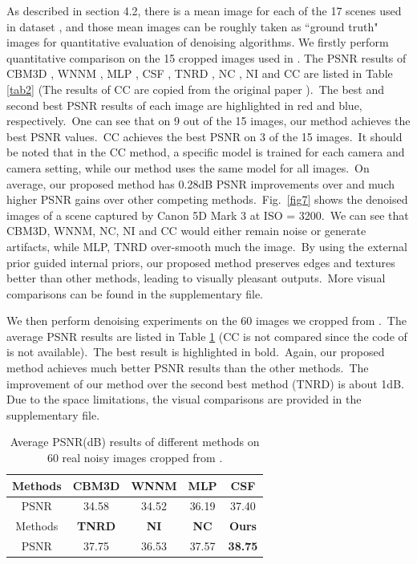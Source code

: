 \documentclass[10pt,twocolumn,letterpaper]{article}
\begin{document}
As described in section 4.2, there is a mean image for each of the 17 scenes used in dataset \cite{crosschannel2016}, and those mean images can be roughly taken as ``ground truth" images for quantitative evaluation of denoising algorithms. We firstly perform quantitative comparison on the 15 cropped images used in \cite{crosschannel2016}. The PSNR results of CBM3D \cite{bm3d}, WNNM \cite{wnnm}, MLP \cite{mlp}, CSF \cite{csf}, TNRD \cite{chen2015learning}, NC \cite{noiseclinic,ncwebsite}, NI \cite{neatimage} and
CC \cite{crosschannel2016} are listed in Table \ref{tab2} (The results of CC are copied from the original paper \cite{crosschannel2016}).\ The best and second best PSNR results of each image are highlighted in red and blue, respectively.\ One can see that on 9 out of the 15 images, our method achieves the best PSNR values.\ CC achieves the best PSNR on 3 of the 15 images.\ It should be noted that in the CC method, a specific model is trained for each camera and camera setting, while our method uses the same model for all images.\ On average, our proposed method has 0.28dB PSNR improvements over \cite{crosschannel2016} and much higher PSNR gains over other competing methods.\ Fig.\ \ref{fig7} shows the denoised images of a scene captured by Canon 5D Mark 3 at ISO = 3200.\ We can see that CBM3D, WNNM, NC, NI and CC would either remain noise or generate artifacts, while MLP, TNRD over-smooth much the image.\ By using the external prior guided internal priors, our proposed method preserves edges and textures better than other methods, leading to visually pleasant outputs.\ More visual comparisons can be found in the supplementary file.

We then perform denoising experiments on the 60 images we cropped from \cite{crosschannel2016}.\ The average PSNR results are listed in Table \ref{tab3} (CC is not compared since the code of \cite{crosschannel2016} is not available).\ The best result is highlighted in bold.\ Again, our proposed method achieves much better PSNR results than the other methods.\ The improvement of our method over the second best method (TNRD) is about 1dB. Due to the space limitations, the visual comparisons are provided in the supplementary file.

\begin{table}
\caption{Average PSNR(dB) results of different methods on 60 real noisy images cropped from \cite{crosschannel2016}.}
\vspace{-3mm}
\label{tab3}
\begin{center}
\renewcommand\arraystretch{1}
\begin{tabular}{|c||c|c|c|c|}
\hline
 Methods& \textbf{CBM3D}&\textbf{WNNM}&\textbf{MLP}&\textbf{CSF}
\\
\hline
PSNR &   34.58 & 34.52 & 36.19 & 37.40
\\
\hline
Methods& \textbf{TNRD} & \textbf{NI} & \textbf{NC} &\textbf{Ours} 
\\
\hline
PSNR & 37.75  & 36.53 & 37.57 & {\textbf{{ 38.75}}}
\\
\hline
\end{tabular}
\end{center}\vspace{-2mm}
\end{table}
\end{document}
